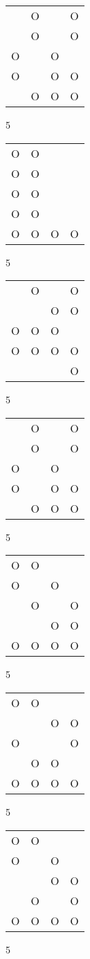 \begin{tabular}{|m{0.2cm}m{0.2cm}m{0.2cm}m{0.2cm}|}\hline
 &O& &O\\
 &O& &O\\
O& &O& \\
O& &O&O\\
 &O&O&O\\
\hline\end{tabular}5
\begin{tabular}{|m{0.2cm}m{0.2cm}m{0.2cm}m{0.2cm}|}\hline
O&O& & \\
O&O& & \\
O&O& & \\
O&O& & \\
O&O&O&O\\
\hline\end{tabular}5
\begin{tabular}{|m{0.2cm}m{0.2cm}m{0.2cm}m{0.2cm}|}\hline
 &O& &O\\
 & &O&O\\
O&O&O& \\
O&O&O&O\\
 & & &O\\
\hline\end{tabular}5
\begin{tabular}{|m{0.2cm}m{0.2cm}m{0.2cm}m{0.2cm}|}\hline
 &O& &O\\
 &O& &O\\
O& &O& \\
O& &O&O\\
 &O&O&O\\
\hline\end{tabular}5
\begin{tabular}{|m{0.2cm}m{0.2cm}m{0.2cm}m{0.2cm}|}\hline
O&O& & \\
O& &O& \\
 &O& &O\\
 & &O&O\\
O&O&O&O\\
\hline\end{tabular}5
\begin{tabular}{|m{0.2cm}m{0.2cm}m{0.2cm}m{0.2cm}|}\hline
O&O& & \\
 & &O&O\\
O& & &O\\
 &O&O& \\
O&O&O&O\\
\hline\end{tabular}5
\begin{tabular}{|m{0.2cm}m{0.2cm}m{0.2cm}m{0.2cm}|}\hline
O&O& & \\
O& &O& \\
 & &O&O\\
 &O& &O\\
O&O&O&O\\
\hline\end{tabular}5
